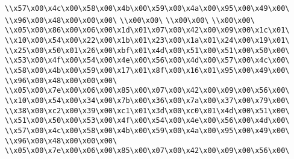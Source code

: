 \verb|\\x57\x00\x4c\x00\x58\x00\x4b\x00\x59\x00\x4a\x00\x95\x00\x49\x00\|\newline
\verb|\\x96\x00\x48\x00\x00\x00\|\newline
\verb|\\x00\x00\|\newline
\verb|\\x00\x00\|\newline
\verb|\\x00\x00\|\newline
\verb|\\x05\x00\x86\x00\x06\x00\x1d\x01\x07\x00\x42\x00\x09\x00\x1c\x01\|\newline
\verb|\\x10\x00\x54\x00\x22\x00\x1b\x01\x23\x00\x1a\x01\x24\x00\x19\x01\|\newline
\verb|\\x25\x00\x50\x01\x26\x00\xbf\x01\x4d\x00\x51\x00\x51\x00\x50\x00\|\newline
\verb|\\x53\x00\x4f\x00\x54\x00\x4e\x00\x56\x00\x4d\x00\x57\x00\x4c\x00\|\newline
\verb|\\x58\x00\x4b\x00\x59\x00\x17\x01\x8f\x00\x16\x01\x95\x00\x49\x00\|\newline
\verb|\\x96\x00\x48\x00\x00\x00\|\newline
\verb|\\x05\x00\x7e\x00\x06\x00\x85\x00\x07\x00\x42\x00\x09\x00\x56\x00\|\newline
\verb|\\x10\x00\x54\x00\x34\x00\x7b\x00\x36\x00\x7a\x00\x37\x00\x79\x00\|\newline
\verb|\\x38\x00\xc2\x00\x39\x00\xc1\x01\x3d\x00\xc0\x01\x4d\x00\x51\x00\|\newline
\verb|\\x51\x00\x50\x00\x53\x00\x4f\x00\x54\x00\x4e\x00\x56\x00\x4d\x00\|\newline
\verb|\\x57\x00\x4c\x00\x58\x00\x4b\x00\x59\x00\x4a\x00\x95\x00\x49\x00\|\newline
\verb|\\x96\x00\x48\x00\x00\x00\|\newline
\verb|\\x05\x00\x7e\x00\x06\x00\x85\x00\x07\x00\x42\x00\x09\x00\x56\x00\|\newline
